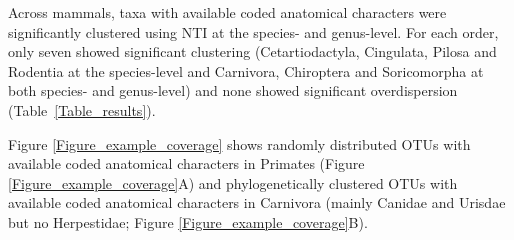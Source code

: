\documentclass[12pt,letterpaper]{article}
\begin{document}


%

Across mammals, taxa with available coded anatomical characters were significantly clustered using NTI at the species- and genus-level.
For each order, only seven showed significant clustering (Cetartiodactyla, Cingulata, Pilosa and Rodentia at the species-level and Carnivora, Chiroptera and Soricomorpha at both species- and genus-level) and none showed significant overdispersion (Table~\ref{Table_results}).

Figure \ref{Figure_example_coverage} shows randomly distributed OTUs with available coded anatomical characters in Primates (Figure \ref{Figure_example_coverage}A) and phylogenetically clustered OTUs with available coded anatomical characters in Carnivora (mainly Canidae and Urisdae but no Herpestidae; Figure \ref{Figure_example_coverage}B).


%
%
\end{document}
